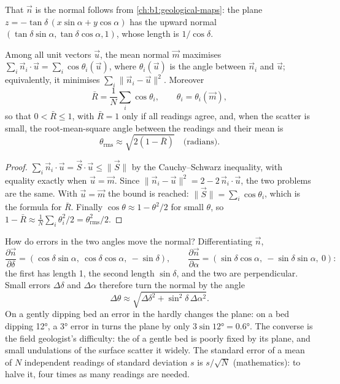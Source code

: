 That $\vec n$ is the normal follows from \cref{ch:b1:geological-maps}: the
plane $z = -\tan\delta\,(x\sin\alpha + y\cos\alpha)$ has the upward normal
$(\tan\delta\sin\alpha, \tan\delta\cos\alpha, 1)$, whose length is
$1/\cos\delta$.

\begin{proposition}\label{prop:b1:field-lab-methods-1:vector-mean}
Among all unit vectors $\vec u$, the mean normal $\vec m$ maximises
$\sum_i \vec n_i\cdot\vec u = \sum_i \cos\theta_i(\vec u)$, where
$\theta_i(\vec u)$ is the angle between $\vec n_i$ and $\vec u$; equivalently,
it minimises $\sum_i \|\vec n_i - \vec u\|^2$. Moreover
\[
  \bar R = \frac1N\sum_i \cos\theta_i, \qquad \theta_i = \theta_i(\vec m),
\]
so that $0 < \bar R \le 1$, with $\bar R = 1$ only if all readings agree, and,
when the scatter is small, the root-mean-square angle between the readings and
their mean is
\[
  \theta_{\text{rms}} \approx \sqrt{2(1 - \bar R)} \quad\text{(radians)}.
\]
\end{proposition}

\begin{proof}
$\sum_i \vec n_i\cdot\vec u = \vec S\cdot\vec u \le \|\vec S\|$ by the
Cauchy--Schwarz inequality, with equality exactly when $\vec u = \vec m$.
Since $\|\vec n_i - \vec u\|^2 = 2 - 2\,\vec n_i\cdot\vec u$, the two problems
are the same. With $\vec u = \vec m$ the bound is reached:
$\|\vec S\| = \sum_i\cos\theta_i$, which is the formula for $\bar R$. Finally
$\cos\theta \approx 1 - \theta^2/2$ for small $\theta$, so $1 - \bar R \approx
\frac1N\sum_i\theta_i^2/2 = \theta_{\text{rms}}^2/2$.
\end{proof}

How do errors in the two angles move the normal? Differentiating $\vec n$,
\[
  \frac{\partial\vec n}{\partial\delta} = (\cos\delta\sin\alpha,\ \cos\delta\cos\alpha,\ -\sin\delta),
  \qquad
  \frac{\partial\vec n}{\partial\alpha} = (\sin\delta\cos\alpha,\ -\sin\delta\sin\alpha,\ 0):
\]
the first has length 1, the second length $\sin\delta$, and the two are
perpendicular. Small errors $\Delta\delta$ and $\Delta\alpha$ therefore
turn the normal by the angle
\[
  \Delta\theta \approx \sqrt{\Delta\delta^2 + \sin^2\delta\,\Delta\alpha^2}.
\]
On a gently dipping bed an error in the  hardly changes the
plane: on a bed dipping \ang{12}, a \ang{3} error in  turns the
plane by only $3\sin\ang{12} = \ang{0.6}$. The converse is the field
geologist's difficulty: the  of a gentle bed is poorly fixed by
its plane, and small undulations of the surface scatter it widely. The
standard error of a mean of $N$ independent readings of standard deviation
$s$ is $s/\sqrt N$ (mathematics): to halve it, four times as many readings
are needed.

